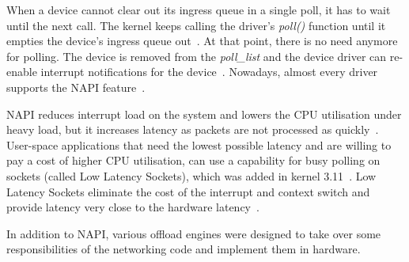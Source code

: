 When a device cannot clear out its ingress queue in a single poll,
it has to wait until the next call.
The kernel keeps calling the driver's {\it{poll()}} function until
it empties the device's ingress queue out~\cite{understanding-internals}.
At that point, there is no need anymore for polling.
The device is removed from the {\it{poll\_list}}
and the device driver can re-enable interrupt notifications for the device~\cite{understanding-internals}.
Nowadays, almost every driver supports the NAPI feature~\cite{linux-kernel-networking}.

NAPI reduces interrupt load on the system and lowers the CPU utilisation under heavy load,
but it increases latency as packets are not processed as quickly~\cite{linux-foundation-napi}.
User-space applications that need the lowest
possible latency and are willing to pay a cost of higher CPU utilisation,
can use a capability for busy polling on sockets (called Low Latency Sockets), which was added in kernel 3.11~\cite{linux-kernel-networking}.
Low Latency Sockets eliminate the cost of the interrupt and context switch
and provide latency very close to the hardware latency~\cite{intel-lls}.

In addition to NAPI, various offload engines were designed to take over some responsibilities of the networking code
and implement them in hardware.
